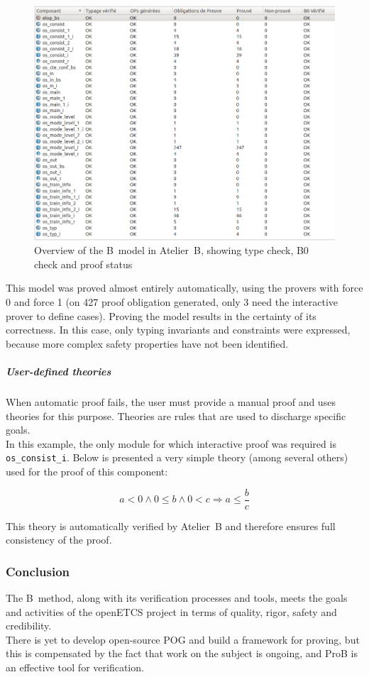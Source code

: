 \begin{figure}[h!]
\centering
\includegraphics[width=1\textwidth]{figures/atelierb}
\caption{Overview of the B~model in Atelier~B, showing type check, B0 check and proof status}
\label{fig:atelierb}
\end{figure}

This model was proved almost entirely automatically, using the provers with force 0 and force 1 (on 427 proof obligation generated, only 3 need the interactive prover to define cases). Proving the model results in the certainty of its correctness. In this case, only typing invariants and constraints were expressed, because more complex safety properties have not been identified.

\subparagraph{User-defined theories}
When automatic proof fails, the user must provide a manual proof and uses theories for this purpose. Theories are rules that are used to discharge specific goals.\\
In this example, the only module for which interactive proof was required is \verb+os_consist_i+. Below is presented a very simple theory (among several others) used for the proof of this component:

\begin{equation}
\tag{User theory 1}
a < 0 \land 0 \leq b \land 0 < c \Rightarrow a \leq \frac{b}{c}
\end{equation}

This theory is automatically verified by Atelier~B and therefore ensures full consistency of the proof.


\subsubsection{Conclusion}
The B~method, along with its verification processes and tools, meets the goals and activities of the openETCS project in terms of quality, rigor, safety and credibility.\\
There is yet to develop open-source POG and build a framework for proving, but this is compensated by the fact that work on the subject is ongoing, and ProB is an effective tool for verification.

